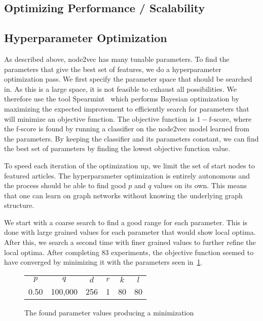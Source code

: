 \subsection{Optimizing Performance / Scalability}

\subsection{Hyperparameter Optimization}
As described above, node2vec has many tunable parameters. To find the parameters that give the best set of features, we do a hyperparameter optimization pass. We first specify the parameter space that should be searched in. As this is a large space, it is not feasible to exhaust all possibilities. We therefore use the tool Spearmint~\cite{snoek2012practical} which performs Bayesian optimization by maximizing the expected improvement to efficiently search for parameters that will minimize an objective function. The objective function is $1 - \text{f-score}$, where the f-score is found by running a classifier on the node2vec model learned from the parameters. By keeping the classifier and its parameters constant, we can find the best set of parameters by finding the lowest objective function value.

To speed each iteration of the optimization up, we limit the set of start nodes to featured articles. The hyperparameter optimization is entirely autonomous and the process should be able to find good $p$ and $q$ values on its own. This means that one can learn on graph networks without knowing the underlying graph structure.

We start with a coarse search to find a good range for each parameter. This is done with large grained values for each parameter that would show local optima. After this, we search a second time with finer grained values to further refine the local optima. After completing 83 experiments, the objective function seemed to have converged by minimizing it with the parameters seen in~\cref{tab:paramopt_goodvalues}.

\begin{figure}%
\centering
\begin{tabular}{cccccc}
\toprule
$p$  & $q$     & $d$ & $r$ & $k$ & $l$ \\
0.50 & 100,000 & 256 & 1   & 80  & 80 \\
\bottomrule
\end{tabular}
\caption[The found parameter values producing a minimization]{The found parameter values producing a minimization }%
\label{tab:paramopt_goodvalues}%
\end{figure}


